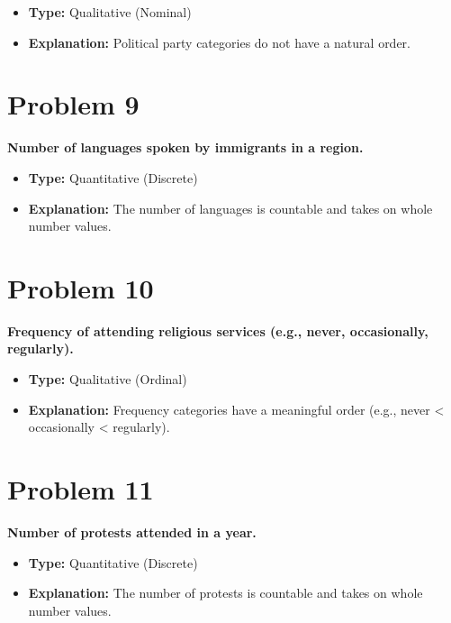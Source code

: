 \documentclass[
  letterpaper,
  DIV=11,
  numbers=noendperiod]{scrreprt}
\begin{document}
\begin{itemize}
\item
  \textbf{Type:} Qualitative (Nominal)
\item
  \textbf{Explanation:} Political party categories do not have a natural
  order.
\end{itemize}

\section*{Problem 9}\label{problem-9-2}


\textbf{Number of languages spoken by immigrants in a region.}

\begin{itemize}
\item
  \textbf{Type:} Quantitative (Discrete)
\item
  \textbf{Explanation:} The number of languages is countable and takes
  on whole number values.
\end{itemize}

\section*{Problem 10}\label{problem-10-2}


\textbf{Frequency of attending religious services (e.g., never,
occasionally, regularly).}

\begin{itemize}
\item
  \textbf{Type:} Qualitative (Ordinal)
\item
  \textbf{Explanation:} Frequency categories have a meaningful order
  (e.g., never \textless{} occasionally \textless{} regularly).
\end{itemize}

\section*{Problem 11}\label{problem-11-2}


\textbf{Number of protests attended in a year.}

\begin{itemize}
\item
  \textbf{Type:} Quantitative (Discrete)
\item
  \textbf{Explanation:} The number of protests is countable and takes on
  whole number values.
\end{itemize}
\end{document}
